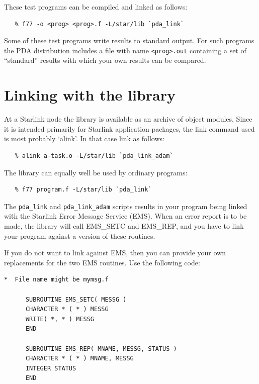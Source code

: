 \documentclass[11pt,twoside]{article}
\newcommand{\xref}[3]{#1}
\begin{document}
These test programs can be compiled and linked as follows:

\begin{verbatim}
   % f77 -o <prog> <prog>.f -L/star/lib `pda_link`
\end{verbatim}

Some of these test programs write results to standard output. For such
programs the PDA distribution includes a file with name \verb+<prog>.out+
containing a set of ``standard'' results with which your own results can
be compared.


\section{\label{LINKING}Linking with the library}

   At a Starlink node the library is available as an archive of object
   modules. Since it is intended
   primarily for Starlink application packages, the link command used is
   most probably `alink'. In that case link as follows:

\begin{verbatim}
   % alink a-task.o -L/star/lib `pda_link_adam`
\end{verbatim}

   The library can equally well be used by ordinary programs:

\begin{verbatim}
   % f77 program.f -L/star/lib `pda_link`
\end{verbatim}

   The {\tt pda\_link} and {\tt pda\_link\_adam} scripts results in your 
   program being linked with the Starlink Error Message Service
\xref{(EMS).}{ssn4}{}
   When an error report is to
   be made, the library will call EMS\_SETC and EMS\_REP, and you have to
   link your program against a version of these routines.

   If you do not want to link against EMS, then you can provide your own
   replacements for the two EMS routines. Use the following code:

\begin{verbatim}
*  File name might be mymsg.f

      SUBROUTINE EMS_SETC( MESSG )
      CHARACTER * ( * ) MESSG
      WRITE( *, * ) MESSG
      END

      SUBROUTINE EMS_REP( MNAME, MESSG, STATUS )
      CHARACTER * ( * ) MNAME, MESSG
      INTEGER STATUS
      END
\end{verbatim}
\end{document}
